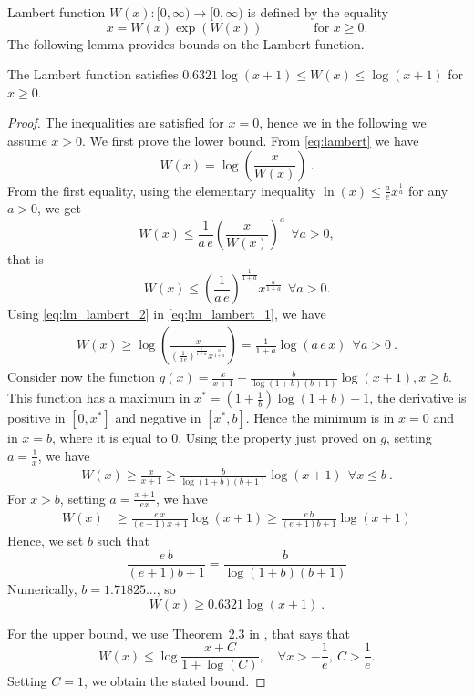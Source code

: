 Lambert function $W(x):[0,\infty) \to [0,\infty)$ is defined by the equality
\begin{equation}
\label{eq:lambert}
x=W(x) \exp \left(W(x)\right) \qquad \qquad \text{for $x \ge 0$}.
\end{equation}
The following lemma provides bounds on the Lambert function.
%
\begin{lemma}
\label{lemma:lambert}
The Lambert function satisfies $0.6321 \log(x+1) \leq W(x) \leq \log(x+1)$ for $x \ge 0$.
\end{lemma}
%
\begin{proof}
The inequalities are satisfied for $x=0$, hence we in the following we assume $x>0$.
We first prove the lower bound. From \eqref{eq:lambert} we have
\begin{equation}
W(x) = \log\left(\frac{x}{W(x)}\right)~. \label{eq:lm_lambert_1}
\end{equation}
From the first equality, using the elementary inequality $\ln (x) \leq \frac{a}{e} x^\frac{1}{a}$ for any $a>0$, we get
\[
W(x) \leq \frac{1}{a\, e}\left(\frac{x}{W(x)}\right)^a  \ \ \forall a>0,
\]
that is
\begin{equation}
\label{eq:lm_lambert_2}
W(x) \leq \left(\frac{1}{a\, e}\right)^\frac{1}{1+a} x^\frac{a}{1+a} \ \ \forall a>0.
\end{equation}
Using \eqref{eq:lm_lambert_2} in \eqref{eq:lm_lambert_1}, we have
\begin{align*}
W(x)
\geq \log\left(\frac{x}{\left(\frac{1}{a\, e}\right)^\frac{1}{1+a} x^\frac{a}{1+a}}\right)
= \frac{1}{1+a}\log\left(a \, e\, x\right) \ \ \forall a>0~.
\end{align*}
Consider now the function $g(x)=\frac{x}{x+1} - \frac{b}{\log(1+b) (b+1)}
\log(x+1), x\geq b$. This function has a maximum in $x^*=(1+\frac{1}{b})
\log(1+b)-1$, the derivative is positive in $[0,x^*]$ and negative in
$[x^*,b]$. Hence the minimum is in $x=0$ and in $x=b$, where it is equal to
$0$.  Using the property just proved on $g$, setting $a=\frac{1}{x}$, we have
\begin{align*}
W(x)
\geq \frac{x}{x+1} \geq \frac{b}{\log(1+b) (b+1)} \log(x+1) \ \  \forall x\leq b~.
\end{align*}
For $x>b$, setting $a=\frac{x+1}{e x}$, we have
\begin{align}
W(x)
&\geq \frac{e\,x}{(e+1) x + 1} \log(x+1) \geq \frac{e\,b}{(e+1) b + 1} \log(x+1)
\end{align}
Hence, we set $b$ such that
\[
\frac{e\, b}{(e+1)b + 1} = \frac{b}{\log(1+b) (b+1)}
\]
Numerically, $b=1.71825...$, so
\[
W(x) \geq 0.6321 \log(x+1)~.
\]

For the upper bound, we use Theorem~2.3 in \cite{hoorfar2008inequalities}, that says that
\[
W(x) \leq \log\frac{x+C}{1+\log(C)}, \quad \forall x> -\frac{1}{e}, \ C>\frac{1}{e}.
\]
Setting $C=1$, we obtain the stated bound.
\end{proof}

